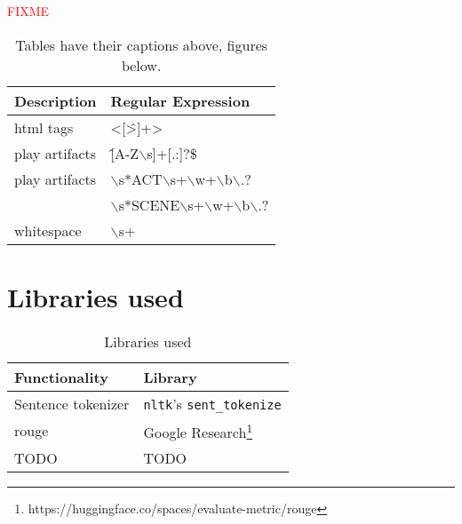 \textcolor{red}{FIXME}
\begin{table}[H]%
  \caption{Tables have their captions above, figures below.}
  \label{table-with-numbers}%
  \centering\small
  \begin{tabular}{@{}ll@{}} %
    \toprule
    \textbf{Description} & \textbf{Regular Expression}  \\
    \midrule
            html tags            & <[\^>]+> \\
            play artifacts       & \^[A-Z$\backslash$s]+[.:]?\$ \\
             play artifacts & $\backslash$s*ACT$\backslash$s+$\backslash$w+$\backslash$b$\backslash$.? \\
& $\backslash$s*SCENE$\backslash$s+$\backslash$w+$\backslash$b$\backslash$.? \\
whitespace           & $\backslash$s+ \\


    \bottomrule
  \end{tabular}
\end{table}











\section{Libraries used}
\label{app:libraries}

\begin{table}[]
\centering
\caption{Libraries used}
\label{tab:libs}
\begin{tabular}{ll}
    \toprule
\textbf{Functionality} & \textbf{Library} \\
\midrule
Sentence tokenizer & \texttt{nltk}'s \texttt{sent\_tokenize}             \\
\ac{rouge}              & Google Research\footnote{https://huggingface.co/spaces/evaluate-metric/rouge} \\
TODO               & TODO             \\
\bottomrule
\end{tabular}%
\end{table}
